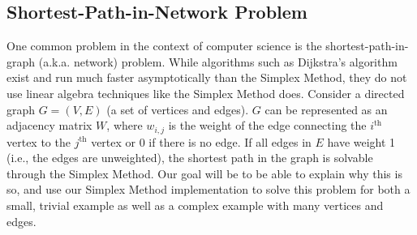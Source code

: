 \documentclass[11pt]{article}
\begin{document}
\subsection{Shortest-Path-in-Network Problem}

One common problem in the context of computer science is the shortest-path-in-graph (a.k.a. network) problem. While algorithms such as Dijkstra's algorithm exist and run much faster asymptotically than the Simplex Method, they do not use linear algebra techniques like the Simplex Method does. Consider a directed graph $G = (V,E)$ (a set of vertices and edges). $G$ can be represented as an adjacency matrix $W$, where $w_{i,j}$ is the weight of the edge connecting the $i^\text{th}$ vertex to the $j^\text{th}$ vertex or 0 if there is no edge. If all edges in $E$ have weight 1 (i.e., the edges are unweighted), the shortest path in the graph is solvable through the Simplex Method. Our goal will be to be able to explain why this is so, and use our Simplex Method implementation to solve this problem for both a small, trivial example as well as a complex example with many vertices and edges.
\end{document}
